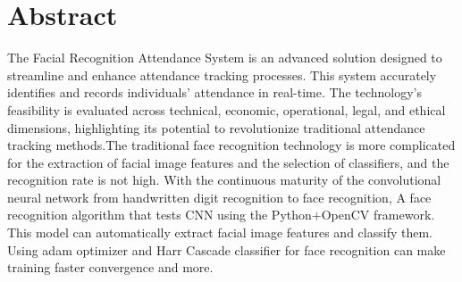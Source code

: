 \chapter*{Abstract}
        The Facial Recognition Attendance System is an advanced solution designed to
 streamline and enhance attendance tracking processes. This system accurately identifies and records individuals' attendance in real-time. The technology's feasibility is evaluated across technical, economic, operational, legal, and ethical dimensions, highlighting its potential to revolutionize 
traditional attendance tracking methods.The traditional face recognition technology is more complicated for the extraction of facial image features and the selection of classifiers, and the recognition rate is not high. With the continuous maturity of the convolutional neural network from handwritten
 digit recognition to face recognition, A face recognition algorithm that tests CNN using the Python+OpenCV framework. This model can automatically extract facial image features and classify them. Using adam optimizer and Harr Cascade classifier
 for face recognition can make training faster convergence and more.

    \tableofcontents
    \listoffigures
    \newpage
		\Large
			\begingroup
				\let\clearpage\relax
